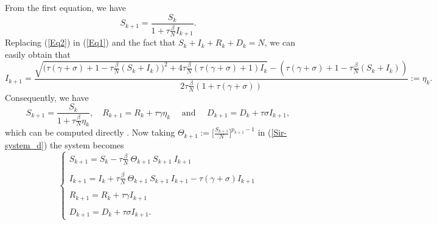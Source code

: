 \documentclass[final,a4paper,reqno]{elsarticle}
\numberwithin{equation}{section}
\begin{document}
From the first equation, we have 
\begin{equation}\label{Eq2}
\displaystyle S_{k+1} =  \frac{S_{k} }{1+\tau \frac{\beta}{N} I_{k+1}}. 
\end{equation}
Replacing (\ref{Eq2}) in  (\ref{Eq1}) and the fact that $S_{k} +I_{k}+R_{k}+D_{k}=N$, we can easily obtain that
\begin{equation}\label{Eq3}
\displaystyle I_{k+1} =  \frac{\sqrt{\Big(\tau( \gamma+\sigma)+1-\tau \frac{ \beta}{N} (S_{k}+I_{k} )\Big)^2+4 \tau\frac{ \beta}{N}( \tau(\gamma+\sigma)+1) I_{k} } -( \tau(\gamma+\sigma)+1- \tau \frac{ \beta}{N}(S_{k}+I_{k} ))}{2 \tau \frac{\beta}{N} (1+\tau(\gamma+\sigma))}:=\eta_{k}.
\end{equation}
Consequently, we have
\begin{equation}\label{Eq4}
\displaystyle S_{k+1} =  \frac{S_{k} }{1+  \tau \frac{\beta}{N} \eta_{k}}, \quad    R_{k+1} = R_{k} +\tau  \gamma  \eta_{k} 
 \quad \mbox{ and }  \quad  D_{k+1} = D_{k} +\tau  \sigma I_{k+1},
\end{equation}
which can be computed directly .
Now taking $\Theta_{k+1} :=\Big[\frac{S_{k+1}}{N}\Big]^{p_{k+1}-1} $  in (\ref{Sir-system_d}) the system becomes
\begin{equation}\label{Sir-system-appro}
\begin{cases}
\displaystyle S_{k+1} = S_{k} -\tau  \frac{\beta}{N}\: \Theta_{k+1} \: S_{k+1}\: I_{k+1}\\ \\
\displaystyle  I_{k+1} = I_{k} +\tau \frac{\beta}{N} \:\Theta_{k+1} \: S_{k+1} \: I_{k+1} -\tau( \gamma+\sigma) I_{k+1}\\ \\
\displaystyle  R_{k+1} = R_{k} +\tau  \gamma I_{k+1}  \\ \\
\displaystyle  D_{k+1} = D_{k} +\tau  \sigma I_{k+1}.
\end{cases}
\end{equation}
\end{document}
